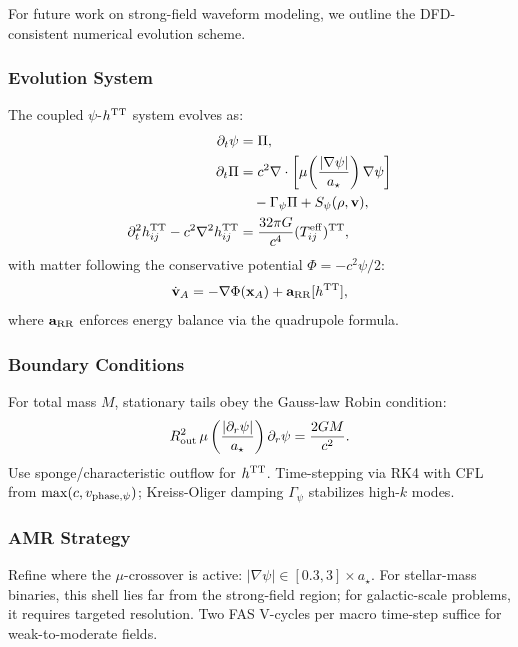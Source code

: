 For future work on strong-field waveform modeling, we outline the DFD-consistent 
numerical evolution scheme.

\subsubsection{Evolution System}
The coupled $\psi$-$h^{\rm TT}$ system evolves as:
\begin{align}
\partial_t\psi &= \Pi, \\
\partial_t\Pi &= c^2 \nabla\cdot\left[\mu\!\left(\frac{|\nabla\psi|}{a_\star}\right)\nabla\psi\right] \nonumber\\
&\quad - \Gamma_\psi\Pi + S_\psi(\rho, \mathbf{v}), \\
\partial_t^2 h_{ij}^{\rm TT} - c^2\nabla^2 h_{ij}^{\rm TT} &= \frac{32\pi G}{c^4}(T_{ij}^{\rm eff})^{\rm TT},
\end{align}
with matter following the conservative potential $\Phi = -c^2\psi/2$:
\begin{equation}
\dot{\mathbf{v}}_A = -\nabla\Phi(\mathbf{x}_A) + \mathbf{a}_{\rm RR}[h^{\rm TT}],
\end{equation}
where $\mathbf{a}_{\rm RR}$ enforces energy balance via the quadrupole formula.

\subsubsection{Boundary Conditions}

For total mass $M$, stationary tails obey the Gauss-law Robin condition:
\begin{equation}
R_{\rm out}^2\,\mu\left(\frac{|\partial_r\psi|}{a_\star}\right)\partial_r\psi = \frac{2GM}{c^2}.
\end{equation}
Use sponge/characteristic outflow for $h^{\rm TT}$. Time-stepping via RK4 with 
CFL from $\max(c, v_{\rm phase,\psi})$; Kreiss-Oliger damping $\Gamma_\psi$ stabilizes high-$k$ modes.

\subsubsection{AMR Strategy}

Refine where the $\mu$-crossover is active: $|\nabla\psi| \in [0.3, 3] \times a_\star$. 
For stellar-mass binaries, this shell lies far from the strong-field region; for 
galactic-scale problems, it requires targeted resolution. Two FAS V-cycles per 
macro time-step suffice for weak-to-moderate fields.

